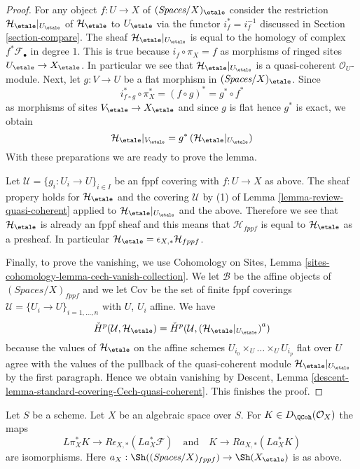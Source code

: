 \begin{proof}
For any object $f : U \to X$ of $(\textit{Spaces}/X)_\etale$
consider the restriction
$\mathcal{H}_\etale|_{U_\etale}$ of $\mathcal{H}_\etale$ to $U_\etale$ via
the functor $i_f^* = i_f^{-1}$ discussed in Section \ref{section-compare}.
The sheaf $\mathcal{H}_\etale|_{U_\etale}$
is equal to the homology of complex $f^*\mathcal{F}_\bullet$ in degree $1$.
This is true because $i_f \circ \pi_X = f$ as morphisms of ringed sites
$U_\etale \to X_\etale$. In particular we see that
$\mathcal{H}_\etale|_{U_\etale}$ is a quasi-coherent $\mathcal{O}_U$-module.
Next, let $g : V \to U$ be a flat
morphism in $(\textit{Spaces}/X)_\etale$. Since
$$
i_{f \circ g}^* \circ \pi_X^* = (f \circ g)^* = g^* \circ f^*
$$
as morphisms of sites $V_\etale \to X_\etale$ and since $g$ is flat
hence $g^*$ is exact, we obtain
$$
\mathcal{H}_\etale|_{V_\etale} =
g^*\left(\mathcal{H}_\etale|_{U_\etale}\right)
$$
With these preparations we are ready to prove the lemma.

\medskip\noindent
Let $\mathcal{U} = \{g_i : U_i \to U\}_{i \in I}$ be an fppf covering
with $f : U \to X$ as above. The sheaf propery holds for
$\mathcal{H}_\etale$ and the covering $\mathcal{U}$
by (1) of Lemma \ref{lemma-review-quasi-coherent}
applied to $\mathcal{H}_\etale|_{U_\etale}$ and the above.
Therefore we see that $\mathcal{H}_\etale$ is already an fppf
sheaf and this means that $\mathcal{H}_{fppf}$ is
equal to $\mathcal{H}_\etale$
as a presheaf. In particular
$\mathcal{H}_\etale = \epsilon_{X, *}\mathcal{H}_{fppf}$.

\medskip\noindent
Finally, to prove the vanishing, we use
Cohomology on Sites, Lemma \ref{sites-cohomology-lemma-cech-vanish-collection}.
We let $\mathcal{B}$ be the affine objects of
$(\textit{Spaces}/X)_{fppf}$ and we let
$\text{Cov}$ be the set of finite fppf coverings
$\mathcal{U} = \{U_i \to U\}_{i = 1, \ldots, n}$ with $U$, $U_i$ affine.
We have
$$
{\check H}^p(\mathcal{U}, \mathcal{H}_\etale) =
{\check H}^p(\mathcal{U}, \left(\mathcal{H}_\etale|_{U_\etale}\right)^a)
$$
because the values of $\mathcal{H}_\etale$ on the
affine schemes $U_{i_0} \times_U \ldots \times_U U_{i_p}$
flat over $U$ agree with the values of the pullback
of the quasi-coherent module $\mathcal{H}_\etale|_{U_\etale}$ by
the first paragraph. Hence we obtain vanishing by
Descent, Lemma \ref{descent-lemma-standard-covering-Cech-quasi-coherent}.
This finishes the proof.
\end{proof}

\begin{lemma}
\label{lemma-cohomological-descent-etale-fppf-modules-unbounded}
Let $S$ be a scheme. Let $X$ be an algebraic space over $S$.
For $K \in D_\QCoh(\mathcal{O}_X)$ the maps
$$
L\pi_X^*K \longrightarrow R\epsilon_{X, *}(La_X^*\mathcal{F})
\quad\text{and}\quad
K \longrightarrow Ra_{X, *}(La_X^*K)
$$
are isomorphisms. Here
$a_X : \Sh((\textit{Spaces}/X)_{fppf}) \to \Sh(X_\etale)$ is as above.
\end{lemma}

